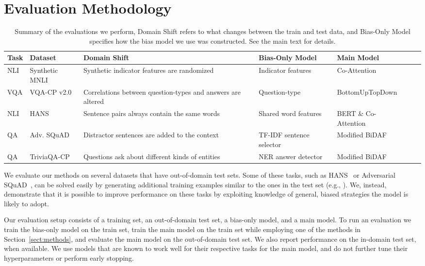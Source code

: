 \documentclass[11pt,a4paper]{article}
\begin{document}
\section{Evaluation Methodology}
\begin{table*}[ht]
    \newcommand{\summarysp}{\addlinespace[0.12cm]}
    \centering
     \begin{small}
    \begin{tabular}{llp{4cm}llll}  \toprule
         Task & Dataset & Domain Shift & Bias-Only Model & Main Model \\ \midrule
         NLI & Synthetic MNLI & Synthetic indicator features are randomized & Indicator features & Co-Attention \\ \summarysp
VQA & VQA-CP v2.0 & Correlations between question-types and answers are altered & Question-type & BottomUpTopDown \\ \summarysp
         NLI & HANS & Sentence pairs always contain the same words & Shared word features & BERT \& Co-Attention \\ \summarysp
         QA & Adv. SQuAD & Distractor sentences are added to the context & TF-IDF sentence selector & Modified BiDAF \\ \summarysp
         QA & TriviaQA-CP & Questions ask about different kinds of entities & NER answer detector & Modified BiDAF \\ 
\bottomrule
    \end{tabular}
    \end{small}
    \caption{Summary of the evaluations we perform, Domain Shift refers to what changes between the train and test data, and Bias-Only Model specifies how the bias model we use was constructed. See the main text for details.}
    \label{tab:evaluations}
\end{table*}

We evaluate our methods on several datasets that have out-of-domain test sets.
Some of these tasks, such as HANS~\cite{mccoy2019right} or Adversarial SQuAD~\cite{adversarial_squad}, can be solved easily by generating additional training examples similar to the ones in the test set (e.g., \citet{wang2018robust}).
We, instead, demonstrate that it is possible to improve performance on these tasks by exploiting knowledge of general, biased strategies the model is likely to adopt.


Our evaluation setup consists of a training set, an out-of-domain test set, a bias-only model, and a main model. To run an evaluation we train the bias-only model on the train set, train the main model on the train set while employing one of the methods in Section~\ref{sect:methods}, and evaluate the main model on the out-of-domain test set. We also report performance on the in-domain test set, when available. 
We use models that are known to work well for their respective tasks for the main model, and do not further tune their hyperparameters or perform early stopping.
\end{document}
